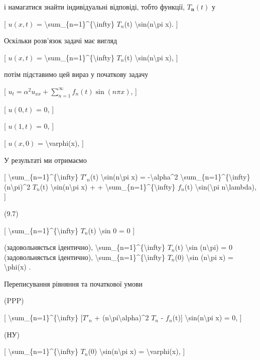 \documentclass[
]{article}
\begin{document}
{{і намагатися знайти індивідуальні відповіді, тобто функції,
\(T_{\mathbf{n}}(t)\) у

{[} \(u(x, t)\) =
\textbackslash sum\_\{n=1\}\^{}\{\textbackslash infty\} \(T_n\)(t)
\textbackslash sin(n\textbackslash pi x). {]}

Оскільки розв'язок задачі має вигляд

{[} \(u(x, t)\) =
\textbackslash sum\_\{n=1\}\^{}\{\textbackslash infty\} \(T_n\)(t)
\textbackslash sin(n\textbackslash pi x), {]}

потім підставимо цей вираз у початкову задачу

{[}
\(u_{t} = \alpha^{2} u_{xx} + \sum_{n=1}^{\infty} f_{n}(t) \sin(n\pi x)\),
{]}

{[} \(u(0, t)\) = 0, {]}

{[} \(u(1, t)\) = 0, {]}

{[} \(u(x, 0)\) = \textbackslash varphi(x), {]}

У результаті ми отримаємо

{[} \textbackslash sum\_\{n=1\}\^{}\{\textbackslash infty\} \(T'_n\)(t)
\textbackslash sin(n\textbackslash pi x) = -\textbackslash alpha\^{}2
\textbackslash sum\_\{n=1\}\^{}\{\textbackslash infty\}
(n\textbackslash pi)\^{}2 \(T_n\)(t)
\textbackslash sin(n\textbackslash pi x) + +
\textbackslash sum\_\{n=1\}\^{}\{\textbackslash infty\} \(f_n\)(t)
\textbackslash sin(\textbackslash pi n\textbackslash lambda), {]}

(9.7)

{[} \textbackslash sum\_\{n=1\}\^{}\{\textbackslash infty\} \(T_n\)(t)
\textbackslash sin 0 = 0 {]}

(задовольняється ідентично),
\textbackslash sum\_\{n=1\}\^{}\{\textbackslash infty\} \(T_n\)(t)
\textbackslash sin (n\textbackslash pi) = 0 (задовольняється ідентично),
\textbackslash sum\_\{n=1\}\^{}\{\textbackslash infty\} \(T_n\)(0)
\textbackslash sin (n\textbackslash pi x) = \textbackslash phi(x) .

Переписування рівняння та початкової умови

(PPP)

{[} \textbackslash sum\_\{n=1\}\^{}\{\textbackslash infty\} {[}\(T'_n\)
+ (n\textbackslash pi\textbackslash alpha)\^{}2 \(T_n\) - \(f_n\)(t){]}
\textbackslash sin(n\textbackslash pi x) = 0, {]}

(НУ)

{[} \textbackslash sum\_\{n=1\}\^{}\{\textbackslash infty\} \(T_n\)(0)
\textbackslash sin(n\textbackslash pi x) = \textbackslash varphi(x), {]}

}}
\end{document}
